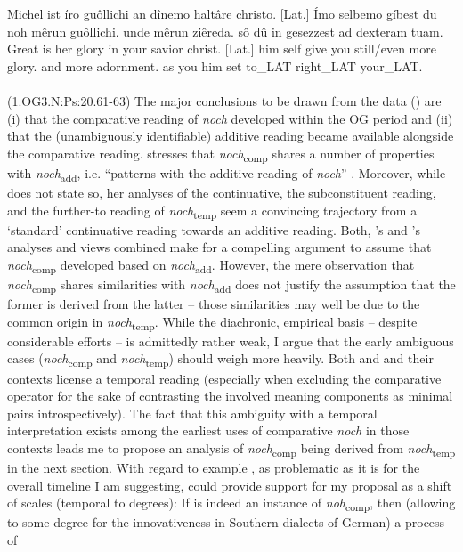 \documentclass[output=paper,
modfonts
]{langscibook}
\begin{document}
\ea\gll Michel ist íro guôllichi an dînemo haltâre christo. [Lat.] Ímo selbemo gíbest du noh mêrun guôllichi. unde mêrun ziêreda. sô dû in gesezzest ad dexteram tuam.\\
       Great is her glory in your savior christ. [Lat.] him self give you still/even more glory. and more adornment. as you him set to\_LAT right\_LAT your\_LAT.\\
\label{OG3_noch_more_glory_first} \\ (1.OG3.N:Ps:20.61-63)
\z
The major conclusions to be drawn from the data () are (i) that the comparative reading of \textit{noch} developed within the OG period and (ii) that the (unambiguously identifiable) additive reading became available alongside the comparative reading. \citeauthor{umbach2009a_comp} \citeyearpar{umbach2009a_comp} stresses that \textit{noch}\textsubscript{comp} shares a number of properties with \textit{noch}\textsubscript{add}, i.e. ``patterns with the additive reading of \textit{noch}'' \citep[p.9]{umbach2009a_comp}. Moreover, while \citeauthor{beck2016a_sub} does not state so, her \citeyearpar{beck2016a_sub} analyses of the continuative, the subconstituent reading, and the further-to reading of \textit{noch}\textsubscript{temp} seem a convincing trajectory from a `standard' continuative reading towards an additive reading. Both, \citeauthor{umbach2009a_comp}'s \citeyearpar{umbach2009a_comp} and \citeauthor{beck2016a_sub}'s \citeyearpar{beck2016a_sub} analyses and views combined make for a compelling argument to assume that \textit{noch}\textsubscript{comp} developed based on \textit{noch}\textsubscript{add}. However, the mere observation that \textit{noch}\textsubscript{comp} shares similarities with \textit{noch}\textsubscript{add} does not justify the assumption that the former is derived from the latter -- those similarities may well be due to the common origin in \textit{noch}\textsubscript{temp}. While the diachronic, empirical basis -- despite considerable efforts -- is admittedly rather weak, I argue that the early ambiguous cases (\textit{noch}\textsubscript{comp} and \textit{noch}\textsubscript{temp}) should weigh more heavily. Both  and  and their contexts license a temporal reading (especially when excluding the comparative operator for the sake of contrasting the involved meaning components as minimal pairs introspectively). The fact that this ambiguity with a temporal interpretation exists among the earliest uses of comparative \textit{noch} in those contexts leads me to propose an analysis of \textit{noch}\textsubscript{comp} being derived from \textit{noch}\textsubscript{temp} in the next section. With regard to example , as problematic as it is for the overall timeline I am suggesting,  could provide support for my proposal as a shift of scales (temporal to degrees): If  is indeed an instance of \textit{noh}\textsubscript{comp}, then (allowing to some degree for the innovativeness in Southern dialects of German) a process of 
\end{document}
